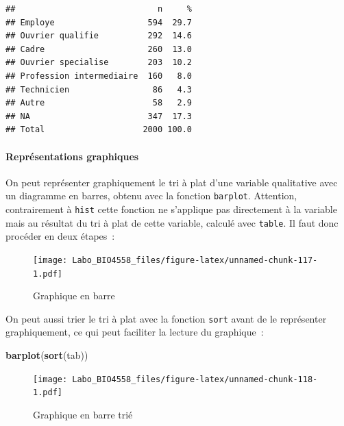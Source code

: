 \documentclass[
  12pt,
]{book}
\newenvironment{Shaded}{\begin{snugshade}}{\end{snugshade}}
\newcommand{\KeywordTok}[1]{\textcolor[rgb]{0.13,0.29,0.53}{\textbf{#1}}}
\newcommand{\NormalTok}[1]{#1}
\newcommand{\OperatorTok}[1]{\textcolor[rgb]{0.81,0.36,0.00}{\textbf{#1}}}
\newcommand{\StringTok}[1]{\textcolor[rgb]{0.31,0.60,0.02}{#1}}
\begin{document}
\begin{verbatim}
##                             n     %
## Employe                   594  29.7
## Ouvrier qualifie          292  14.6
## Cadre                     260  13.0
## Ouvrier specialise        203  10.2
## Profession intermediaire  160   8.0
## Technicien                 86   4.3
## Autre                      58   2.9
## NA                        347  17.3
## Total                    2000 100.0
\end{verbatim}

\hypertarget{repruxe9sentations-graphiques}{%
\paragraph{Représentations graphiques}\label{repruxe9sentations-graphiques}}

On peut représenter graphiquement le tri à plat d'une variable qualitative avec un diagramme en barres, obtenu avec la fonction \texttt{barplot}. Attention, contrairement à \texttt{hist} cette fonction ne s'applique pas directement à la variable mais au résultat du tri à plat de cette variable, calculé avec \texttt{table}. Il faut donc procéder en deux étapes~:

\begin{Shaded}
\end{Shaded}

\begin{figure}
\centering
\texttt{[image: Labo\_BIO4558\_files/figure-latex/unnamed-chunk-117-1.pdf]}
\caption{\label{fig:unnamed-chunk-117}Graphique en barre}
\end{figure}

On peut aussi trier le tri à plat avec la fonction \texttt{sort} avant de le représenter graphiquement, ce qui peut faciliter la lecture du graphique~:

\begin{Shaded}
\begin{Highlighting}[]
\KeywordTok{barplot}\NormalTok{(}\KeywordTok{sort}\NormalTok{(tab))}
\end{Highlighting}
\end{Shaded}

\begin{figure}
\centering
\texttt{[image: Labo\_BIO4558\_files/figure-latex/unnamed-chunk-118-1.pdf]}
\caption{\label{fig:unnamed-chunk-118}Graphique en barre trié}
\end{figure}
\end{document}
